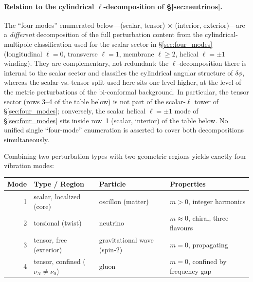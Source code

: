 \documentclass[11pt]{article}
\begin{document}
\paragraph{Relation to the cylindrical
$\ell$-decomposition of \S\ref{sec:neutrinos}.}
The ``four modes'' enumerated below---(scalar,
tensor)$\,\times\,$(interior, exterior)---are a
\emph{different} decomposition of the full
perturbation content from the cylindrical-%
multipole classification used for the scalar
sector in \S\ref{sec:four_modes} (longitudinal
$\ell=0$, transverse $\ell=1$, membrane
$\ell\geq 2$, helical $\ell=\pm 1$ winding).
They are complementary, not redundant: the
$\ell$-decomposition there is internal to the
scalar sector and classifies the cylindrical
angular structure of $\delta\phi$, whereas the
scalar-vs.-tensor split used here sits one level
higher, at the level of the metric perturbations
of the bi-conformal background.  In particular,
the tensor sector (rows 3--4 of the table below)
is not part of the scalar-$\ell$ tower of
\S\ref{sec:four_modes}; conversely, the scalar
helical $\ell=\pm 1$ mode of
\S\ref{sec:four_modes} sits inside row~1
(scalar, interior) of the table below.  No
unified single ``four-mode'' enumeration is
asserted to cover both decompositions
simultaneously.

Combining two perturbation types with two
geometric regions yields exactly four vibration
modes:

\medskip
\begin{center}
\renewcommand{\arraystretch}{1.4}
\begin{tabular}{@{}r@{\;:\;\;}l@{\;\;$\to$\;\;}l@{\;\;$\to$\;\;}l@{}}
\toprule
\textbf{Mode} & \textbf{Type / Region}
  & \textbf{Particle} & \textbf{Properties} \\
\midrule
1 & scalar, localized (core)
  & oscillon (matter)
  & $m > 0$, integer harmonics \\
2 & torsional (twist)
  & neutrino
  & $m \approx 0$, chiral, three flavours \\
3 & tensor, free (exterior)
  & gravitational wave (spin-2)\footnotemark
  & $m = 0$, propagating \\
4 & tensor, confined ($\nu_N \neq \nu_0$)
  & gluon
  & $m = 0$, confined by frequency gap \\
\bottomrule
\end{tabular}
\end{center}

\end{document}

